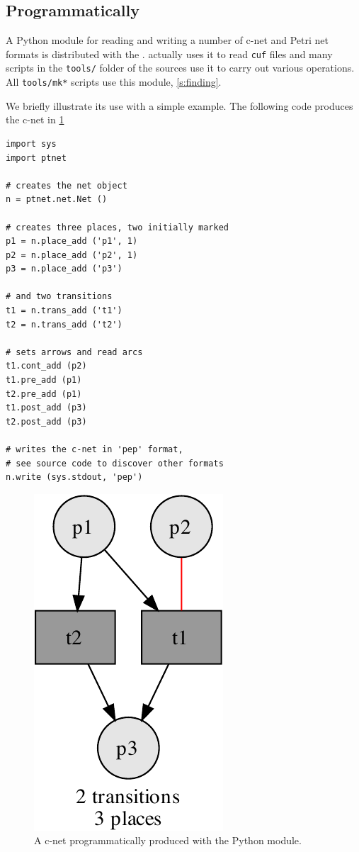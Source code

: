 \documentclass[a4paper]{refart}
\begin{document}
\subsection{Programmatically}%
\label{s:program}

A Python module for reading and writing a number of c-net and Petri net
formats is distributed with the \cunft{}.
\cna actually uses it to read \verb!cuf! files and many scripts in the
\verb!tools/! folder of the sources use it to carry out various operations.
All \verb!tools/mk*! scripts use this module, \cf \cref{s:finding}.

We briefly illustrate its use with a simple example.  The following code
produces the c-net in \cref{f:ptnet}

\begin{verbatim}
import sys
import ptnet

# creates the net object
n = ptnet.net.Net ()

# creates three places, two initially marked
p1 = n.place_add ('p1', 1)
p2 = n.place_add ('p2', 1)
p3 = n.place_add ('p3')

# and two transitions
t1 = n.trans_add ('t1')
t2 = n.trans_add ('t2')

# sets arrows and read arcs
t1.cont_add (p2)
t1.pre_add (p1)
t2.pre_add (p1)
t1.post_add (p3)
t2.post_add (p3)

# writes the c-net in 'pep' format,
# see source code to discover other formats
n.write (sys.stdout, 'pep')
\end{verbatim}

\begin{figure}[bth]
\centering
\includegraphics[scale=0.5]{fig/ptnet.pdf}
\caption{A c-net programmatically produced with the  Python
module.}
\label{f:ptnet}
\end{figure}




\end{document}
